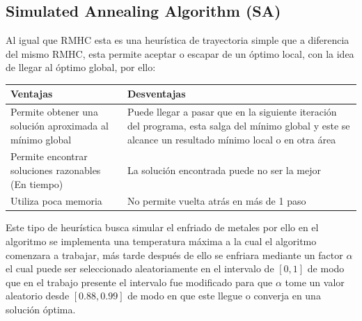 \documentclass[10pt]{article}
\begin{document}
\subsection{Simulated Annealing Algorithm (SA)}
Al igual que RMHC esta es una heurística de trayectoria simple que a diferencia del mismo RMHC, esta permite aceptar o escapar de un óptimo local, con la idea de llegar al óptimo global, por ello:
\begin{center}
  \begin{tabular}{|p{5cm}|p{5cm}|}
    \hline
    Ventajas & Desventajas \\
    \hline
    Permite obtener una solución aproximada al mínimo global & Puede llegar a pasar que en la siguiente iteración del programa, esta salga del mínimo global y este se alcance un resultado mínimo local o en otra área\\
    \hline
    Permite encontrar soluciones razonables (En tiempo) & La solución encontrada puede no ser la mejor\\
    \hline
    Utiliza poca memoria & No permite vuelta atrás en más de 1 paso\\
    \hline
  \end{tabular}
\end{center}

Este tipo de heurística busca simular el enfriado de metales por ello en el algoritmo se implementa una temperatura máxima a la cual el algoritmo comenzara a trabajar, más tarde después de ello se enfriara mediante un factor $\alpha$ el cual puede ser seleccionado aleatoriamente en el intervalo de $[0,1]$ de modo que en el trabajo presente el intervalo fue modificado para que $\alpha$ tome un valor aleatorio desde $[0.88,0.99]$ de modo en que este llegue o converja en una solución óptima.
\end{document}
